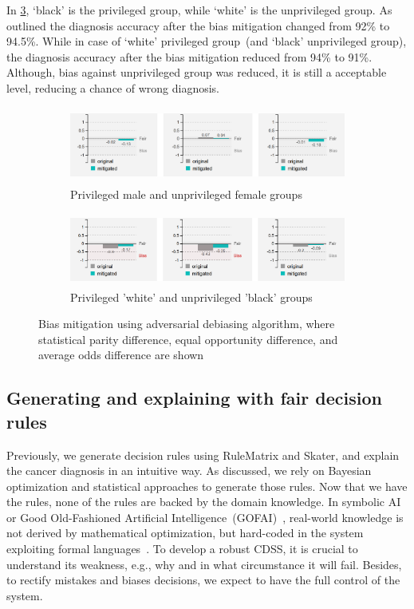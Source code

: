 \hspace*{3.5mm} In \cref{fig:debiases_2}, `black' is the privileged group, while `white' is the unprivileged group. As outlined the diagnosis accuracy after the bias mitigation changed from 92\% to 94.5\%. While in case of `white' privileged group~(and `black' unprivileged group), the diagnosis accuracy after the bias mitigation reduced from 94\% to 91\%. Although, bias against unprivileged group was reduced, it is still a acceptable level, reducing a chance of wrong diagnosis.  

\begin{figure}[h]
	\centering
	\begin{subfigure}{.48\linewidth}
		\centering
		\includegraphics[width=\linewidth,height=25mm]{images/debias_3.png}
		\caption{Privileged male and unprivileged female groups}
		 \label{fig:debias_3}
	\end{subfigure}
	\begin{subfigure}{0.48\linewidth}
		\centering
		\includegraphics[width=\linewidth,height=24mm]{images/debias_4.png}
		\caption{Privileged 'white' and unprivileged 'black' groups}
        \label{fig:debias_4}
	\end{subfigure}
	\caption{Bias mitigation using adversarial debiasing algorithm, where statistical parity difference, equal opportunity difference, and average odds difference are shown}
	\label{fig:debiases_2}
	\vspace{-2mm}
\end{figure}
\fi 

\subsection{Generating and explaining with fair decision rules}
\label{sec:rule_gen_inter}
Previously, we generate decision rules using RuleMatrix and Skater, and explain the cancer diagnosis in an intuitive way. As discussed, we rely on Bayesian optimization and statistical approaches to generate those rules. Now that we have the rules, none of the rules are backed by the domain knowledge. In symbolic AI or Good Old-Fashioned Artificial Intelligence~(GOFAI)~\cite{GoFI}, real-world knowledge is not derived by mathematical optimization, but hard-coded in the system exploiting formal languages~\cite{futia2020integration}. To develop a robust CDSS, it is crucial to understand its weakness, e.g., why and in what circumstance it will fail. Besides, to rectify mistakes and biases decisions, we expect to have the full control of the system. 

